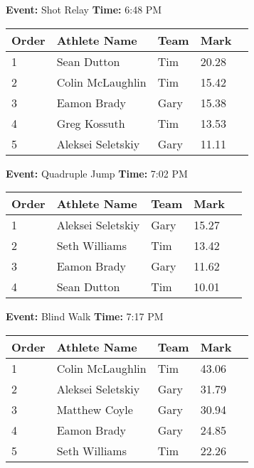 \documentclass[10pt]{article}
\begin{document}
\textbf{Event:} Shot Relay \quad \textbf{Time:} 6:48 PM 

\vspace{1em}
\begin{tabular}{@{}lllll@{}}
\toprule

\textbf{Order} & \textbf{Athlete Name} & \textbf{Team} & \textbf{Mark} \\
\midrule
1 & Sean Dutton & Tim & 20.28 &\\
2 & Colin McLaughlin & Tim & 15.42 &\\
3 & Eamon Brady & Gary & 15.38 &\\
4 & Greg Kossuth & Tim & 13.53 &\\
5 & Aleksei Seletskiy & Gary & 11.11 &\\
\bottomrule
\end{tabular}
\vspace{2.5em}


\textbf{Event:} Quadruple Jump \quad \textbf{Time:} 7:02 PM 

\vspace{1em}
\begin{tabular}{@{}lllll@{}}
\toprule

\textbf{Order} & \textbf{Athlete Name} & \textbf{Team} & \textbf{Mark} \\
\midrule
1 & Aleksei Seletskiy & Gary & 15.27 &\\
2 & Seth Williams & Tim & 13.42 &\\
3 & Eamon Brady & Gary & 11.62 &\\
4 & Sean Dutton & Tim & 10.01 &\\
\bottomrule
\end{tabular}
\vspace{2.5em}


\textbf{Event:} Blind Walk \quad \textbf{Time:} 7:17 PM 

\vspace{1em}
\begin{tabular}{@{}lllll@{}}
\toprule

\textbf{Order} & \textbf{Athlete Name} & \textbf{Team} & \textbf{Mark} \\
\midrule
1 & Colin McLaughlin & Tim & 43.06 &\\
2 & Aleksei Seletskiy & Gary & 31.79 &\\
3 & Matthew Coyle & Gary & 30.94 &\\
4 & Eamon Brady & Gary & 24.85 &\\
5 & Seth Williams & Tim & 22.26 &\\
\bottomrule
\end{tabular}
\vspace{2.5em}
\end{document}

